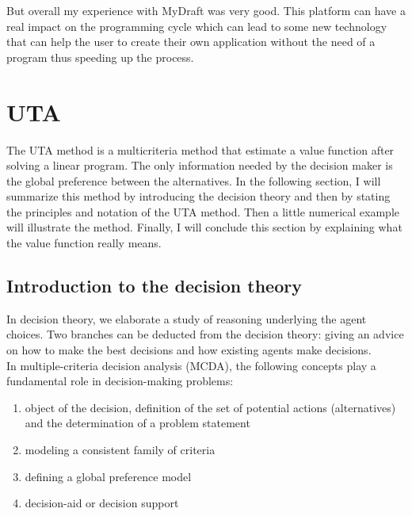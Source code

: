\documentclass{report}
\begin{document}
But overall my experience with MyDraft was very good. This platform can have a real impact on the programming cycle which can lead to some new technology that can help the user to create their own application without the need of a program thus speeding up the process.

\section{UTA}
The UTA method is a multicriteria method that estimate a value function after solving a linear program. The only information needed by the decision maker is the global preference between the alternatives. In the following section, I will summarize this method by introducing the decision theory and then by stating the principles and notation of the UTA method. Then a little numerical example will illustrate the method. Finally, I will conclude this section by explaining what the value function really means.\\

\subsection{Introduction to the decision theory}
In decision theory, we elaborate a study of reasoning underlying the agent choices. Two branches can be deducted from the decision theory: giving an advice on how to make the best decisions and how existing agents make decisions. \\
In multiple-criteria decision analysis (MCDA), the following concepts play a fundamental role in decision-making problems: 
\begin{enumerate}
\item object of the decision, definition of the set of potential actions (alternatives) and the determination of a problem statement
\item modeling a consistent family of criteria
\item defining a global preference model
\item decision-aid or decision support
\end{enumerate}
\end{document}

